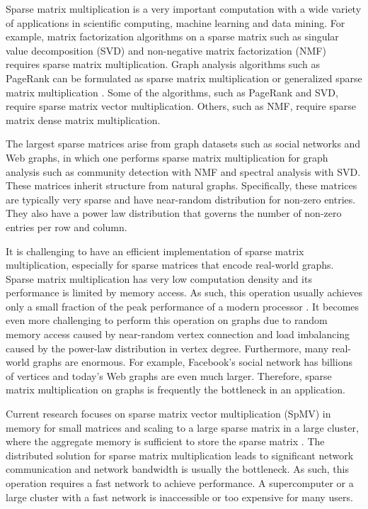Sparse matrix multiplication is a very important computation with a wide variety
of applications in scientific computing, machine learning and data mining.
For example, matrix factorization algorithms on a sparse matrix such as
singular value decomposition (SVD) \cite{svd} and non-negative matrix
factorization (NMF) \cite{nmf} requires sparse matrix multiplication.
Graph analysis algorithms such as PageRank \cite{pagerank} can be
formulated as sparse matrix multiplication or generalized sparse matrix
multiplication \cite{Mattson13}. Some of
the algorithms, such as PageRank and SVD, require sparse matrix vector
multiplication. Others, such as NMF, require sparse matrix dense
matrix multiplication.

The largest sparse matrices arise from graph datasets such as social networks
and Web graphs, in which one performs
sparse matrix multiplication for graph analysis such as community detection
with NMF and spectral analysis with SVD. These matrices inherit structure
from natural graphs. Specifically,
these matrices are typically very sparse and have near-random distribution
for non-zero entries. They also have a power law distribution that governs
the number of non-zero entries per row and column.


It is challenging to have an efficient implementation of sparse matrix
multiplication, especially for sparse matrices that encode real-world graphs.
Sparse matrix multiplication has very low computation density and its performance
is limited by memory access. As such, this operation usually achieves only
a small fraction of the peak performance of a modern processor \cite{Williams07}.
It becomes even more challenging to perform this operation on graphs due to
random memory access caused by near-random vertex connection and load imbalancing
caused by the power-law distribution in vertex degree. Furthermore, many
real-world graphs
are enormous. For example, Facebook's social network has billions of vertices
and today's Web graphs are even much larger. %
Therefore, sparse matrix multiplication on graphs is frequently the bottleneck
in an application.

Current research focuses on sparse matrix vector multiplication (SpMV) in memory
for small matrices and scaling to a large sparse matrix in a large cluster,
where the aggregate memory is sufficient to store the sparse matrix
\cite{Williams07, Yoo11, Boman2013}.
The distributed solution for sparse matrix multiplication leads to significant
network communication and network bandwidth is usually the bottleneck.
As such, this operation requires a fast network to achieve performance.
A supercomputer or a large cluster with a fast network is inaccessible or
too expensive for many users.

